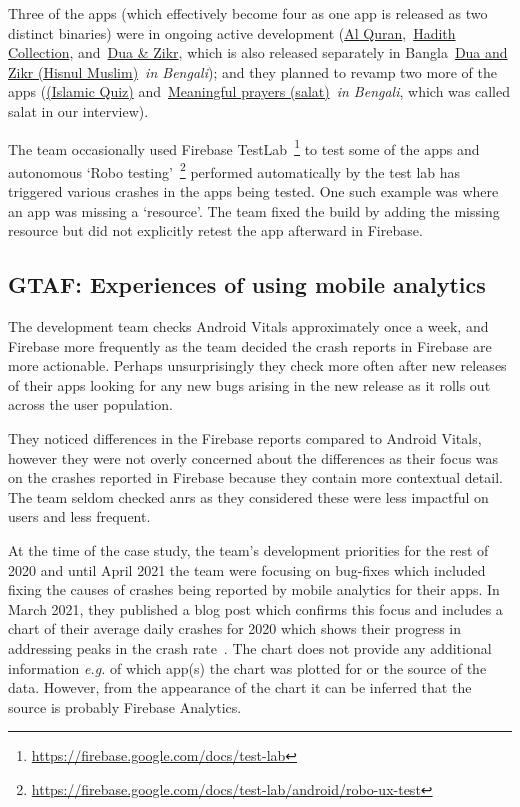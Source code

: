 Three of the apps (which effectively become four as one app is released as two distinct binaries) were in ongoing active development (\href{https://play.google.com/store/apps/details?id=com.greentech.quran}{Al Quran},~\href{https://play.google.com/store/apps/details?id=com.greentech.hadith}{Hadith Collection}, and~\href{https://play.google.com/store/apps/details?id=com.greentech.hisnulmuslim}{Dua \& Zikr}, which is also released separately in Bangla~\href{https://play.google.com/store/apps/details?id=com.greentech.hisnulmuslimbn}{{Dua and Zikr (Hisnul Muslim)}}~\emph{in Bengali}); and they planned to revamp two more of the apps (\href{https://play.google.com/store/apps/details?id=com.greentech.islamicquiz}{(Islamic Quiz)} and~\href{https://play.google.com/store/apps/details?id=com.greentech.salatbn}{Meaningful prayers (salat)}~\textit{in Bengali}, which was called salat in our interview).

The team occasionally used Firebase TestLab~\footnote{\url{https://firebase.google.com/docs/test-lab}} to test some of the apps and autonomous `Robo testing'~\footnote{\url{https://firebase.google.com/docs/test-lab/android/robo-ux-test}} performed automatically by the test lab has triggered various crashes in the apps being tested. One such example was where an app was missing a `resource'. The team fixed the build by adding the missing resource but did not explicitly retest the app afterward in Firebase.  

\subsection{GTAF: Experiences of using mobile analytics}
The development team checks Android Vitals approximately once a week, and Firebase more frequently as the team decided the crash reports in Firebase are more actionable. Perhaps unsurprisingly they check more often after new releases of their apps looking for any new bugs arising in the new release as it rolls out across the user population.

They noticed differences in the Firebase reports compared to Android Vitals, however they were not overly concerned about the differences as their focus was on the crashes reported in Firebase because they contain more contextual detail. The team seldom checked \acrshort{anr}s as they considered these were less impactful on users and less frequent. %

At the time of the case study, the team's development priorities for the rest of 2020 and until April 2021 the team were focusing on bug-fixes which included fixing the causes of crashes being reported by mobile analytics for their apps. In March 2021, they published a blog post which confirms this focus and includes a chart of their average daily crashes for 2020 which shows their progress in addressing peaks in the crash rate~. The chart does not provide any additional information \emph{e.g.} of which app(s) the chart was plotted for or the source of the data. However, from the appearance of the chart it can be inferred that the source is probably Firebase Analytics.

